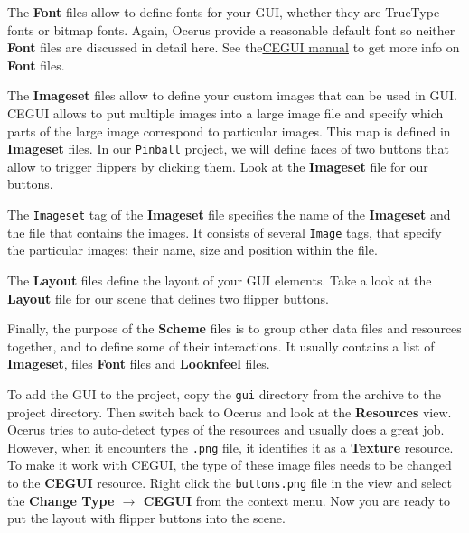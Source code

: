 \documentclass[a4paper,12pt]{article}
\begin{document}
The \textbf{Font} files allow to define fonts for your GUI, whether they are TrueType fonts or bitmap fonts. Again, Ocerus provide a reasonable default font so neither \textbf{Font} files are discussed in detail here. See the\href{http://www.cegui.org.uk/api_reference/xml_font.html}{CEGUI manual} to get more info on \textbf{Font} files.

The \textbf{Imageset} files allow to define your custom images that can be used in GUI. CEGUI allows to put multiple images into a large image file and specify which parts of the large image correspond to particular images. This map is defined in \textbf{Imageset} files. In our \texttt{Pinball} project, we will define faces of two buttons that allow to trigger flippers by clicking them. Look at the \textbf{Imageset} file for our buttons.


The \texttt{Imageset} tag of the \textbf{Imageset} file specifies the name of the \textbf{Imageset} and the file that contains the images. It consists of several \texttt{Image} tags, that specify the particular images; their name, size and position within the file.

The \textbf{Layout} files define the layout of your GUI elements. Take a look at the \textbf{Layout} file for our scene that defines two flipper buttons.


Finally, the purpose of the \textbf{Scheme} files is to group other data files and resources together, and to define some of their interactions. It usually contains a list of \textbf{Imageset}, files \textbf{Font} files and \textbf{Looknfeel} files.

To add the GUI to the project, copy the \texttt{gui} directory from the archive to the project directory. Then switch back to Ocerus and look at the \textbf{Resources} view. Ocerus tries to auto-detect types of the resources and usually does a great job. However, when it encounters the \texttt{.png} file, it identifies it as a \textbf{Texture} resource. To make it work with CEGUI, the type of these image files needs to be changed to the \textbf{CEGUI} resource. Right click the \texttt{buttons.png} file in the view and select the \textbf{Change Type $\to$ CEGUI} from the context menu. Now you are ready to put the layout with flipper buttons into the scene.
\end{document}
